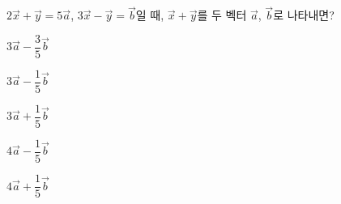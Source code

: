 $2\vec{x}+\vec{y}=5\vec{a}$, $3\vec{x}-\vec{y}=\vec{b}$일 때, $\vec{x}+\vec{y}$를 두 벡터 $\vec{a}$, $\vec{b}$로 나타내면?
\begin{choices32}{\rule[-3ex]{0pt}{8ex}$3\vec{a}-\dfrac{3}{5}\vec{b}$}{\rule[-3ex]{0pt}{8ex}$3\vec{a}-\dfrac{1}{5}\vec{b}$}{\rule[-3ex]{0pt}{8ex}$3\vec{a}+\dfrac{1}{5}\vec{b}$}{\rule[-3ex]{0pt}{8ex}$4\vec{a}-\dfrac{1}{5}\vec{b}$}{\rule[-3ex]{0pt}{8ex}$4\vec{a}+\dfrac{1}{5}\vec{b}$}\end{choices32}
